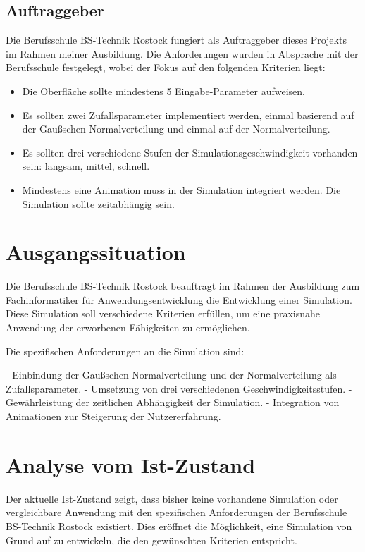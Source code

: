 \documentclass{article}
\begin{document}
\subsection{Auftraggeber}
Die Berufsschule BS-Technik Rostock fungiert als Auftraggeber dieses Projekts im Rahmen meiner Ausbildung. Die Anforderungen wurden in Absprache mit der Berufsschule festgelegt, wobei der Fokus auf den folgenden Kriterien liegt:

\begin{itemize}
    \item Die Oberfläche sollte mindestens 5 Eingabe-Parameter aufweisen.
    \item Es sollten zwei Zufallsparameter implementiert werden, einmal basierend auf der Gaußschen Normalverteilung und einmal auf der Normalverteilung.
    \item Es sollten drei verschiedene Stufen der Simulationsgeschwindigkeit vorhanden sein: langsam, mittel, schnell.
    \item Mindestens eine Animation muss in der Simulation integriert werden. Die Simulation sollte zeitabhängig sein.
\end{itemize}

\section{Ausgangssituation}
Die Berufsschule BS-Technik Rostock beauftragt im Rahmen der Ausbildung zum Fachinformatiker für Anwendungsentwicklung die Entwicklung einer Simulation. Diese Simulation soll verschiedene Kriterien erfüllen, um eine praxisnahe Anwendung der erworbenen Fähigkeiten zu ermöglichen.

Die spezifischen Anforderungen an die Simulation sind:

- Einbindung der Gaußschen Normalverteilung und der Normalverteilung als Zufallsparameter.
- Umsetzung von drei verschiedenen Geschwindigkeitsstufen.
- Gewährleistung der zeitlichen Abhängigkeit der Simulation.
- Integration von Animationen zur Steigerung der Nutzererfahrung.

\section{Analyse vom Ist-Zustand}
Der aktuelle Ist-Zustand zeigt, dass bisher keine vorhandene Simulation oder vergleichbare Anwendung mit den spezifischen Anforderungen der Berufsschule BS-Technik Rostock existiert. Dies eröffnet die Möglichkeit, eine Simulation von Grund auf zu entwickeln, die den gewünschten Kriterien entspricht.
\end{document}
